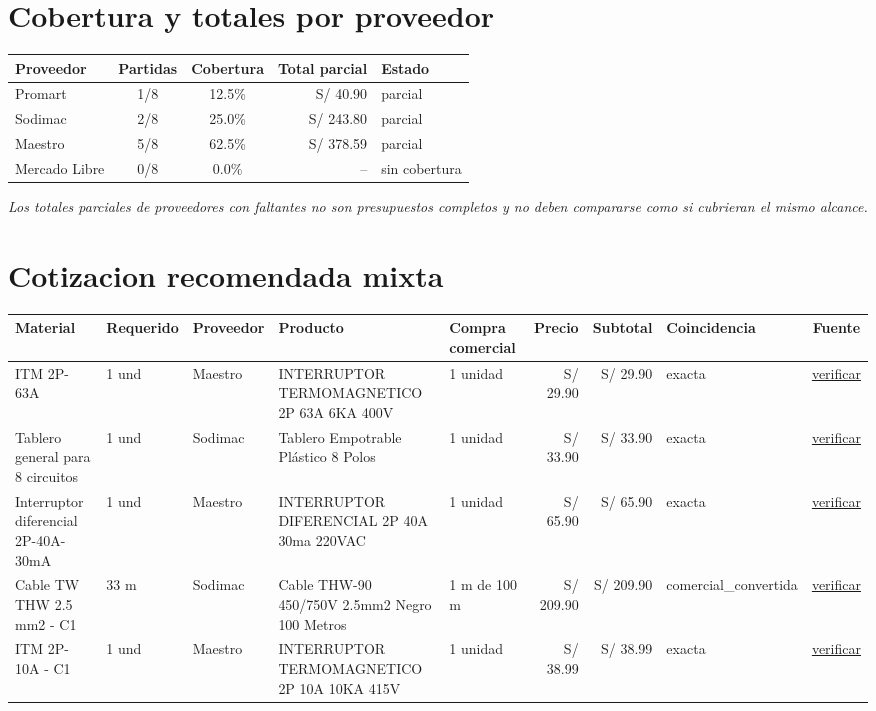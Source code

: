 \documentclass[11pt,a4paper]{article}
\begin{document}
\section{Cobertura y totales por proveedor}
\begin{tabular}{lccrl}
\toprule Proveedor & Partidas & Cobertura & Total parcial & Estado \\ \midrule
Promart & 1/8 & 12.5\% & S/ 40.90 & parcial \\
Sodimac & 2/8 & 25.0\% & S/ 243.80 & parcial \\
Maestro & 5/8 & 62.5\% & S/ 378.59 & parcial \\
Mercado Libre & 0/8 & 0.0\% & -- & sin cobertura \\
\bottomrule
\end{tabular}

\textit{Los totales parciales de proveedores con faltantes no son presupuestos completos y no deben compararse como si cubrieran el mismo alcance.}

\section{Cotizacion recomendada mixta}
\small
\begin{longtable}{p{} p{} p{} p{} p{} r r p{} c}
\toprule Material & Requerido & Proveedor & Producto & Compra comercial & Precio & Subtotal & Coincidencia & Fuente \\ \midrule\endhead
ITM 2P-63A & 1 und & Maestro & INTERRUPTOR TERMOMAGNETICO 2P 63A 6KA 400V & 1 unidad & S/ 29.90 & S/ 29.90 & exacta & \href{\detokenize{https://www.falabella.com.pe/falabella-pe/search?Ntt=interruptor+termomagnetico+2+polos+63A}}{verificar} \\
Tablero general para 8 circuitos & 1 und & Sodimac & Tablero Empotrable Plástico 8 Polos & 1 unidad & S/ 33.90 & S/ 33.90 & exacta & \href{\detokenize{https://www.falabella.com.pe/falabella-pe/product/113523151/Tablero-Empotrable-Plastico-8-Polos}}{verificar} \\
Interruptor diferencial 2P-40A-30mA & 1 und & Maestro & INTERRUPTOR DIFERENCIAL 2P 40A 30ma 220VAC & 1 unidad & S/ 65.90 & S/ 65.90 & exacta & \href{\detokenize{https://www.falabella.com.pe/falabella-pe/search?Ntt=interruptor+diferencial+2+polos+40A+30mA}}{verificar} \\
Cable TW THW 2.5 mm2 - C1 & 33 m & Sodimac & Cable THW-90 450/750V 2.5mm2 Negro 100 Metros & 1 m de 100 m & S/ 209.90 & S/ 209.90 & comercial\_convertida & \href{\detokenize{https://www.falabella.com.pe/falabella-pe/product/113533476/cable-thw-90-450-750v-2-5mm2-negro-100-metros}}{verificar} \\
ITM 2P-10A - C1 & 1 und & Maestro & INTERRUPTOR TERMOMAGNETICO 2P 10A 10KA 415V & 1 unidad & S/ 38.99 & S/ 38.99 & exacta & \href{\detokenize{https://www.falabella.com.pe/falabella-pe/search?Ntt=interruptor+termomagnetico+2+polos+10A}}{verificar} \\
\bottomrule
\end{longtable}
\normalsize
\end{document}
